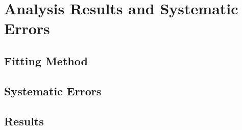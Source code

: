 \chapter{Analysis Results and Systematic Errors}

\section{Fitting Method}

\section{Systematic Errors}

\section{Results}